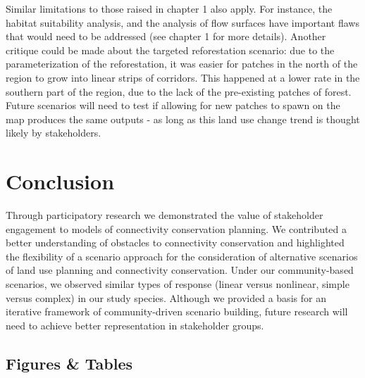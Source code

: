 {Similar limitations to those raised in chapter 1 also apply. For instance, the habitat suitability analysis, and the analysis of flow surfaces have important flaws that would need to be addressed (see chapter 1 for more details). Another critique could be made about the targeted reforestation scenario: due to the parameterization of the reforestation, it was easier for patches in the north of the region to grow into linear strips of corridors. This happened at a lower rate in the southern part of the region, due to the lack of the pre-existing patches of forest. Future scenarios will need to test if allowing for new patches to spawn on the map produces the same outputs - as long as this land use change trend is thought likely by stakeholders. 

\section{Conclusion}

Through participatory research we demonstrated the value of stakeholder engagement to models of connectivity conservation planning. We contributed a better understanding of obstacles to connectivity conservation and highlighted the flexibility of a scenario approach for the consideration of alternative scenarios of land use planning and connectivity conservation. Under our community-based scenarios, we observed similar types of response (linear versus nonlinear, simple versus complex) in our study species. Although we provided a basis for an iterative framework of community-driven scenario building, future research will need to achieve better representation in stakeholder groups. 


\newpage
\begin{center}
\section*{Figures \& Tables}
\end{center}



}
